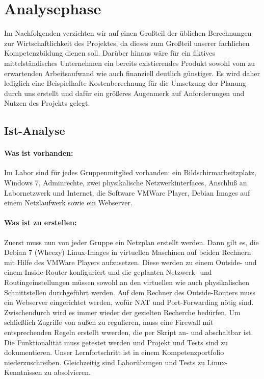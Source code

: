 \section{Analysephase} 
\label{sec:Analysephase}

Im Nachfolgenden verzichten wir auf einen Großteil der üblichen Berechnungen zur Wirtschaftlichkeit des Projektes, da dieses zum Großteil unserer fachlichen Kompetenzbildung dienen soll. Darüber hinaus wäre für ein fiktives mittelständisches Unternehmen ein bereits existierendes Produkt sowohl vom zu erwartenden Arbeitsaufwand wie auch finanziell deutlich günstiger. Es wird daher lediglich eine Beispielhafte Kostenberechnung für die Umsetzung der Planung durch uns erstellt und dafür ein größeres Augenmerk auf Anforderungen und Nutzen des Projekts gelegt. 

\subsection{Ist-Analyse} 
\label{sec:IstAnalyse}

\paragraph*{Was ist vorhanden: } Im Labor sind für jedes Gruppenmitglied vorhanden: ein Bildschirmarbeitzplatz, Windows 7, Adminrechte, zwei physikalische Netzwerkinterfaces, Anschluß an Labornetzwerk und Internet, die Software VMWare Player, Debian Images auf einem Netzlaufwerk sowie ein Webserver.
    
\paragraph*{Was ist zu erstellen: } Zuerst muss nun von jeder Gruppe ein Netzplan erstellt werden. Dann gilt es, die Debian 7 (Wheezy) Linux-Images in virtuellen Maschinen auf beiden Rechnern mit Hilfe des VMWare Players aufzusetzen. Diese werden zu einem Outside- und einem Inside-Router konfiguriert und die geplanten Netzwerk- und Routingeinstellungen müssen sowohl an den virtuellen wie auch physikalischen Schnittstellen durchgeführt werden. Auf dem Rechner des Outside-Routers muss ein Webserver eingerichtet werden, wofür NAT und Port-Forwarding nötig sind. Zwischendurch wird es immer wieder der gezielten Recherche bedürfen. Um schließlich Zugriffe von außen zu regulieren, muss eine Firewall mit entsprechenden Regeln erstellt wwerden, die per Skript an- und abschaltbar ist. Die Funktionalität muss getestet werden und Projekt und Tests sind zu dokumentieren. Unser Lernfortschritt ist in einem Kompetenzportfolio niederzuschreiben. Gleichzeitig sind Laborübungen und Tests zu Linux-Kenntnissen zu absolvieren.


